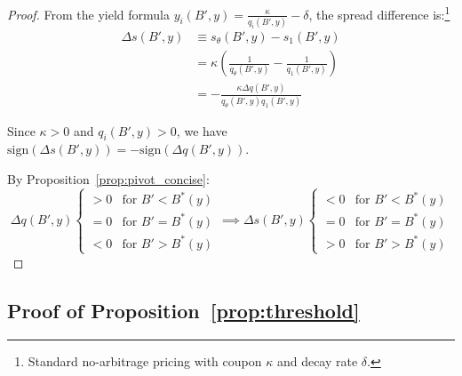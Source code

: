 \documentclass[12pt]{article}
\theoremstyle{plain}
\begin{document}
\begin{proof}
	From the yield formula $y_i(B', y) = \frac{\kappa}{q_i(B', y)} - \delta$, the spread difference is:\footnote{Standard no-arbitrage pricing with coupon $\kappa$ and decay rate $\delta$.}
	\begin{align}
		\Delta s(B', y) & \equiv s_\theta(B', y) - s_1(B', y) \nonumber                                                                 \\
		                & = \kappa \left( \frac{1}{q_\theta(B', y)} - \frac{1}{q_1(B', y)} \right) \label{eq:spread_difference_compact} \\
		                & = -\frac{\kappa \Delta q(B', y)}{q_\theta(B', y) q_1(B', y)} \label{eq:spread_price_relationship_compact}
	\end{align}

	Since $\kappa > 0$ and $q_i(B', y) > 0$, we have $\mathrm{sign}(\Delta s(B',
		y)) = -\mathrm{sign}(\Delta q(B', y))$.

	By Proposition~\ref{prop:pivot_concise}:
	\begin{equation}
		\Delta q(B', y) \left\{ \begin{array}{cl}
			> 0 & \text{for } B' < B^*(y) \\
			= 0 & \text{for } B' = B^*(y) \\
			< 0 & \text{for } B' > B^*(y)
		\end{array} \right. \implies \Delta s(B', y) \left\{ \begin{array}{cl}
			< 0 & \text{for } B' < B^*(y) \\
			= 0 & \text{for } B' = B^*(y) \\
			> 0 & \text{for } B' > B^*(y)
		\end{array} \right. \label{eq:spread_pivot_pattern}
	\end{equation}
\end{proof}

\subsection{Proof of Proposition~\ref{prop:threshold}}\label{app:proof_threshold}
\end{document}
